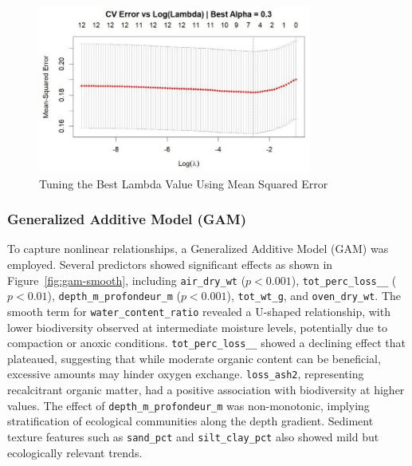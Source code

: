 \documentclass[12pt]{article}
\begin{document}
\begin{figure}[h!]
\centering
\includegraphics[width=0.8\textwidth]{tune-best-lambda-value-using-MSE.jpg}
\caption{Tuning the Best Lambda Value Using Mean Squared Error}
\label{fig:tune-lambda-mse}
\end{figure}

\subsubsection{Generalized Additive Model (GAM)}

\qquad To capture nonlinear relationships, a Generalized Additive Model (GAM) was employed. Several predictors showed significant effects as shown in Figure~\ref{fig:gam-smooth}, including \texttt{air\_dry\_wt} ($p < 0.001$), \texttt{tot\_perc\_loss\_\_} ($p < 0.01$), \texttt{depth\_m\_profondeur\_m} ($p < 0.001$), \texttt{tot\_wt\_g}, and \texttt{oven\_dry\_wt}. The smooth term for \texttt{water\_content\_ratio} revealed a U-shaped relationship, with lower biodiversity observed at intermediate moisture levels, potentially due to compaction or anoxic conditions. \texttt{tot\_perc\_loss\_\_} showed a declining effect that plateaued, suggesting that while moderate organic content can be beneficial, excessive amounts may hinder oxygen exchange. \texttt{loss\_ash2}, representing recalcitrant organic matter, had a positive association with biodiversity at higher values. The effect of \texttt{depth\_m\_profondeur\_m} was non-monotonic, implying stratification of ecological communities along the depth gradient. Sediment texture features such as \texttt{sand\_pct} and \texttt{silt\_clay\_pct} also showed mild but ecologically relevant trends.
\end{document}
